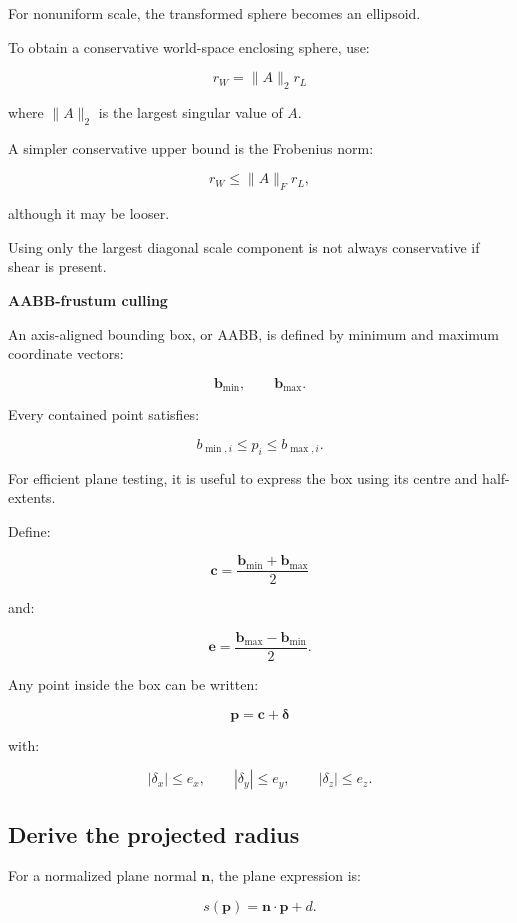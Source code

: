 For nonuniform scale, the transformed sphere becomes an ellipsoid.

To obtain a conservative world-space enclosing sphere, use:

\[
 \boxed{ r_W=\|A\|_2r_L }
\]

where \(\|A\|_2\) is the largest singular value of \(A\).

A simpler conservative upper bound is the Frobenius norm:

\[
 r_W\le\|A\|_Fr_L,
\]

although it may be looser.

Using only the largest diagonal scale component is not always conservative if shear is present.

\textbf{AABB-frustum culling}

An axis-aligned bounding box, or AABB, is defined by minimum and maximum coordinate vectors:

\[
 \mathbf b_{\min}, \qquad \mathbf b_{\max}.
\]

Every contained point satisfies:

\[
 b_{\min,i}\le p_i\le b_{\max,i}.
\]

For efficient plane testing, it is useful to express the box using its centre and half-extents.

Define:

\[
 \boxed{ \mathbf c= \frac{\mathbf b_{\min}+\mathbf b_{\max}}2 }
\]

and:

\[
 \boxed{ \mathbf e= \frac{\mathbf b_{\max}-\mathbf b_{\min}}2 }.
\]

Any point inside the box can be written:

\[
 \mathbf p=\mathbf c+\boldsymbol\delta
\]

with:

\[
 |\delta_x|\le e_x, \qquad |\delta_y|\le e_y, \qquad |\delta_z|\le e_z.
\]

\subsection{Derive the projected radius}\label{02-foundations-ii-ch034-derive-the-projected-radius}

\hypertarget{02-foundations-ii-ch034-derive-the-projected-radius}{}

For a normalized plane normal \(\mathbf n\), the plane expression is:

\[
 s(\mathbf p)=\mathbf n\cdot\mathbf p+d.
\]

